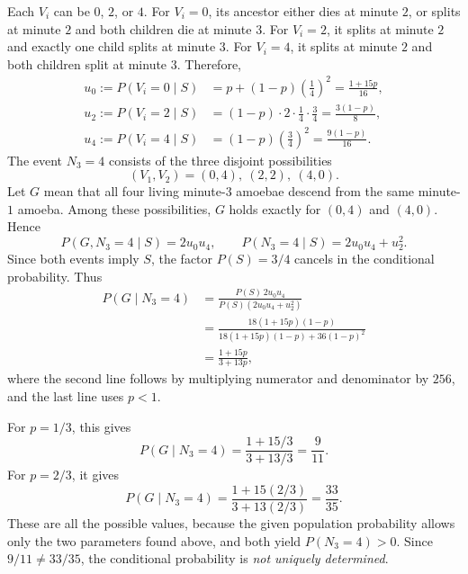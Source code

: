 \documentclass[11pt,a4paper]{article}
\newcommand{\Prob}{P}
\begin{document}
\begin{enumerate}
Each $V_i$ can be $0$, $2$, or $4$. For $V_i=0$, its ancestor either
dies at minute $2$, or splits at minute $2$ and both children die at
minute $3$. For $V_i=2$, it splits at minute $2$ and exactly one child
splits at minute $3$. For $V_i=4$, it splits at minute $2$ and both
children split at minute $3$. Therefore,
\begin{align*}
u_0:=\Prob(V_i=0\mid S)
&=p+(1-p)\left(\frac14\right)^2=\frac{1+15p}{16},\\
u_2:=\Prob(V_i=2\mid S)
&=(1-p)\cdot2\cdot\frac14\cdot\frac34=\frac{3(1-p)}8,\\
u_4:=\Prob(V_i=4\mid S)
&=(1-p)\left(\frac34\right)^2=\frac{9(1-p)}{16}.
\end{align*}
The event $N_3=4$ consists of the three disjoint possibilities
\[
(V_1,V_2)=(0,4),\ (2,2),\ (4,0).
\]
Let $G$ mean that all four living minute-$3$ amoebae descend from the
same minute-$1$ amoeba. Among these possibilities, $G$ holds exactly
for $(0,4)$ and $(4,0)$. Hence
\[
\Prob(G,N_3=4\mid S)=2u_0u_4,\qquad
\Prob(N_3=4\mid S)=2u_0u_4+u_2^2.
\]
Since both events imply $S$, the factor $\Prob(S)=3/4$ cancels in the
conditional probability. Thus
\begin{align*}
\Prob(G\mid N_3=4)
&=\frac{\Prob(S)\,2u_0u_4}
        {\Prob(S)(2u_0u_4+u_2^2)}\\
&=\frac{18(1+15p)(1-p)}
        {18(1+15p)(1-p)+36(1-p)^2}\\
&=\frac{1+15p}{3+13p},
\end{align*}
where the second line follows by multiplying numerator and denominator
by $256$, and the last line uses $p<1$.

For $p=1/3$, this gives
\[
\Prob(G\mid N_3=4)=\frac{1+15/3}{3+13/3}
=\boxed{\frac9{11}}.
\]
For $p=2/3$, it gives
\[
\Prob(G\mid N_3=4)=\frac{1+15(2/3)}{3+13(2/3)}
=\boxed{\frac{33}{35}}.
\]
These are all the possible values, because the given population
probability allows only the two parameters found above, and both yield
$\Prob(N_3=4)>0$. Since $9/11\ne33/35$, the conditional probability is
\emph{not uniquely determined}.
\end{enumerate}
\end{document}
